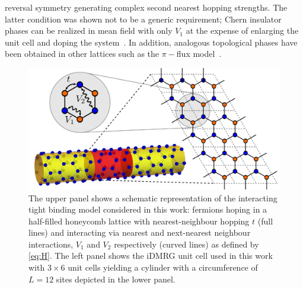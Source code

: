 \documentclass[aps,prx,10pt,twocolumn,floatfix,superscriptaddress,showpacs,numerical,footinbib]{revtex4-1}
\begin{document}
reversal symmetry generating complex second nearest hopping strengths.
%
The latter condition 
was shown not to be a generic requirement; Chern insulator phases can be realized 
in mean field with only $V_{1}$ at the expense of enlarging the unit cell and doping the system~\cite{CGV11,GCC13}.
%
In addition, analogous topological phases have been obtained in other lattices such as the $\pi-$flux model~\cite{WF10,JGC13}.
%
\begin{figure}
%
 \includegraphics[width=\columnwidth]{pdf/unit_cell.pdf}
 \caption{The upper panel shows a schematic representation of the interacting tight binding model considered in this work:
fermions hoping in a half-filled honeycomb lattice with nearest-neighbour hopping $t$ (full lines) and interacting via
 nearest and next-nearest neighbour interactions, $V_{1}$ and $V_{2}$ respectively (curved lines) as defined by 
 \eqref{eq:H}.
 The left panel shows the iDMRG unit cell used in this work with 
 $3 \times 6$ unit cells yielding a cylinder with a circumference of $L=12$ sites depicted in the lower panel. 
 \label{fig:Defs}}
\end{figure}
\\
\end{document}
